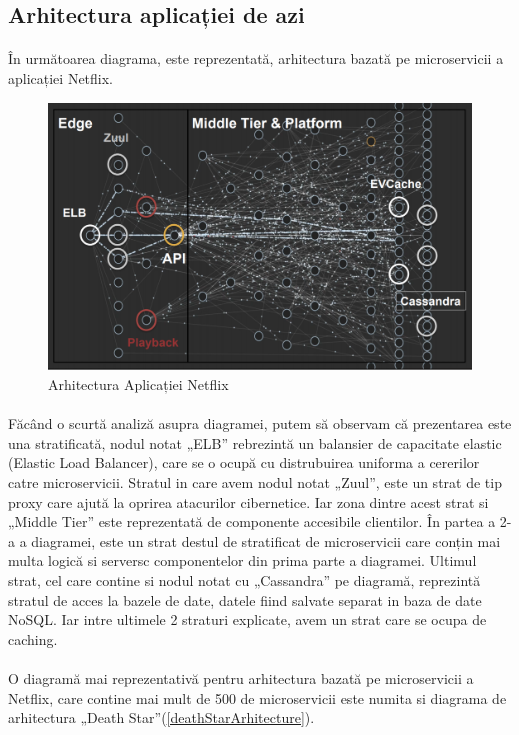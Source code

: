 \documentclass[12pt]{report}
\begin{document}
	\subsection{Arhitectura aplicației de azi}
	\paragraph{}În următoarea diagrama, este reprezentată, arhitectura bazată pe microservicii a aplicației Netflix.
	\begin{figure}[h]
  	\includegraphics[scale=.651]{netflixarhitecuture}
	\caption{Arhitectura Aplicației Netflix \cite{ruslan}}  
  	\end{figure}
  	\paragraph{}Făcând o scurtă analiză asupra diagramei, putem să observam că prezentarea este una stratificată, nodul notat „ELB” rebrezintă un balansier de capacitate elastic (Elastic Load Balancer), care se o ocupă cu distrubuirea uniforma a cererilor catre microservicii. Stratul in care avem nodul notat „Zuul”, este un strat de tip proxy care ajută la oprirea atacurilor cibernetice. Iar zona dintre acest strat si „Middle Tier” este reprezentată de componente accesibile clientilor. În partea a 2-a a diagramei, este un strat destul de stratificat de microservicii care conțin mai multa logică si serversc componentelor din prima parte a diagramei. Ultimul strat, cel care contine si nodul notat cu „Cassandra” pe diagramă, reprezintă stratul de acces la bazele de date, datele fiind salvate separat in baza de date NoSQL. Iar intre ultimele 2 straturi   explicate, avem un strat care se ocupa de caching. \cite{evans}
  	\paragraph{}O diagramă mai reprezentativă pentru arhitectura bazată pe microservicii a Netflix, care contine mai mult de 500 de microservicii este numita si diagrama de arhitectura „Death Star”(\ref{deathStarArhitecture}).
\end{document}

